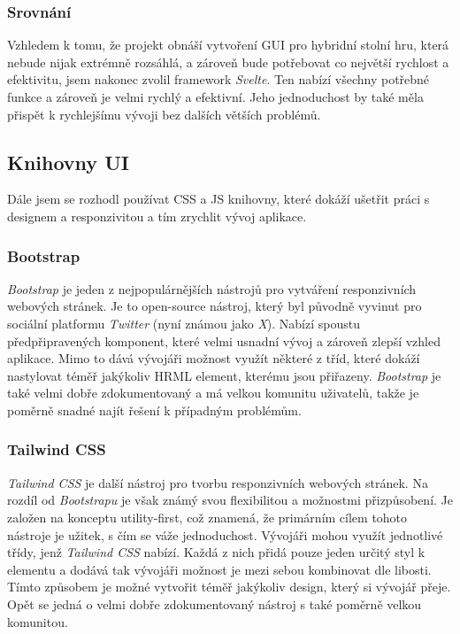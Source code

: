 \subsubsection*{Srovnání}
Vzhledem k tomu, že projekt obnáší vytvoření GUI pro hybridní stolní hru, která nebude nijak extrémně rozsáhlá, a zároveň bude potřebovat co největší rychlost a efektivitu, jsem nakonec zvolil framework \textit{Svelte}. Ten nabízí všechny potřebné funkce a zároveň je velmi rychlý a efektivní. Jeho jednoduchost by také měla přispět k rychlejšímu vývoji bez dalších větších problémů.

\subsection{Knihovny UI}
Dále jsem se rozhodl používat CSS a JS knihovny, které dokáží ušetřit práci s designem a responzivitou a tím zrychlit vývoj aplikace.

\subsubsection*{Bootstrap}
\textit{Bootstrap} je jeden z nejpopulárnějších nástrojů pro vytváření responzivních webových stránek. Je to open-source nástroj, který byl původně vyvinut pro sociální platformu \textit{Twitter} (nyní známou jako \textit{X}). Nabízí spoustu předpřipravených komponent, které velmi usnadní vývoj a zároveň zlepší vzhled aplikace. Mimo to dává vývojáři možnost využít některé z tříd, které dokáží nastylovat téměř jakýkoliv HRML element, kterému jsou přiřazeny. \textit{Bootstrap} je také velmi dobře zdokumentovaný a má velkou komunitu uživatelů, takže je poměrně snadné najít řešení k případným problémům. \cite{bootstrap,what_is_bootstrap}

\subsubsection*{Tailwind CSS}
\textit{Tailwind CSS} je další nástroj pro tvorbu responzivních webových stránek. Na rozdíl od \textit{Bootstrapu} je však známý svou flexibilitou a možnostmi přizpůsobení. Je založen na konceptu utility-first, což znamená, že primárním cílem tohoto nástroje je užitek, s čím se váže jednoduchost. Vývojáři mohou využít jednotlivé třídy, jenž \textit{Tailwind CSS} nabízí. Každá z nich přidá pouze jeden určitý styl k elementu a dodává tak vývojáři možnost je mezi sebou kombinovat dle libosti. Tímto způsobem je možné vytvořit téměř jakýkoliv design, který si vývojář přeje. Opět se jedná o velmi dobře zdokumentovaný nástroj s také poměrně velkou komunitou. \cite{tailwind_css}

